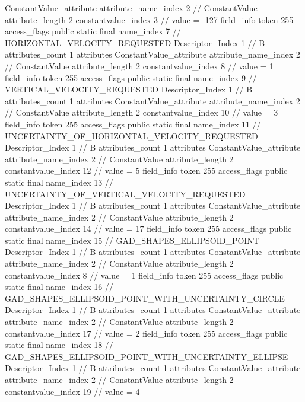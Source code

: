 {{{{{{				ConstantValue_attribute {
					attribute_name_index	2		// ConstantValue
					attribute_length	2
					constantvalue_index	3		// value = -127
				}
				}
			}
			field_info {
				token	255
				access_flags	public static final
				name_index	7		// HORIZONTAL_VELOCITY_REQUESTED
				Descriptor_Index	1		// B
				attributes_count	1
				attributes {
				ConstantValue_attribute {
					attribute_name_index	2		// ConstantValue
					attribute_length	2
					constantvalue_index	8		// value = 1
				}
				}
			}
			field_info {
				token	255
				access_flags	public static final
				name_index	9		// VERTICAL_VELOCITY_REQUESTED
				Descriptor_Index	1		// B
				attributes_count	1
				attributes {
				ConstantValue_attribute {
					attribute_name_index	2		// ConstantValue
					attribute_length	2
					constantvalue_index	10		// value = 3
				}
				}
			}
			field_info {
				token	255
				access_flags	public static final
				name_index	11		// UNCERTAINTY_OF_HORIZONTAL_VELOCITY_REQUESTED
				Descriptor_Index	1		// B
				attributes_count	1
				attributes {
				ConstantValue_attribute {
					attribute_name_index	2		// ConstantValue
					attribute_length	2
					constantvalue_index	12		// value = 5
				}
				}
			}
			field_info {
				token	255
				access_flags	public static final
				name_index	13		// UNCERTAINTY_OF_VERTICAL_VELOCITY_REQUESTED
				Descriptor_Index	1		// B
				attributes_count	1
				attributes {
				ConstantValue_attribute {
					attribute_name_index	2		// ConstantValue
					attribute_length	2
					constantvalue_index	14		// value = 17
				}
				}
			}
			field_info {
				token	255
				access_flags	public static final
				name_index	15		// GAD_SHAPES_ELLIPSOID_POINT
				Descriptor_Index	1		// B
				attributes_count	1
				attributes {
				ConstantValue_attribute {
					attribute_name_index	2		// ConstantValue
					attribute_length	2
					constantvalue_index	8		// value = 1
				}
				}
			}
			field_info {
				token	255
				access_flags	public static final
				name_index	16		// GAD_SHAPES_ELLIPSOID_POINT_WITH_UNCERTAINTY_CIRCLE
				Descriptor_Index	1		// B
				attributes_count	1
				attributes {
				ConstantValue_attribute {
					attribute_name_index	2		// ConstantValue
					attribute_length	2
					constantvalue_index	17		// value = 2
				}
				}
			}
			field_info {
				token	255
				access_flags	public static final
				name_index	18		// GAD_SHAPES_ELLIPSOID_POINT_WITH_UNCERTAINTY_ELLIPSE
				Descriptor_Index	1		// B
				attributes_count	1
				attributes {
				ConstantValue_attribute {
					attribute_name_index	2		// ConstantValue
					attribute_length	2
					constantvalue_index	19		// value = 4
}}}}}}}
